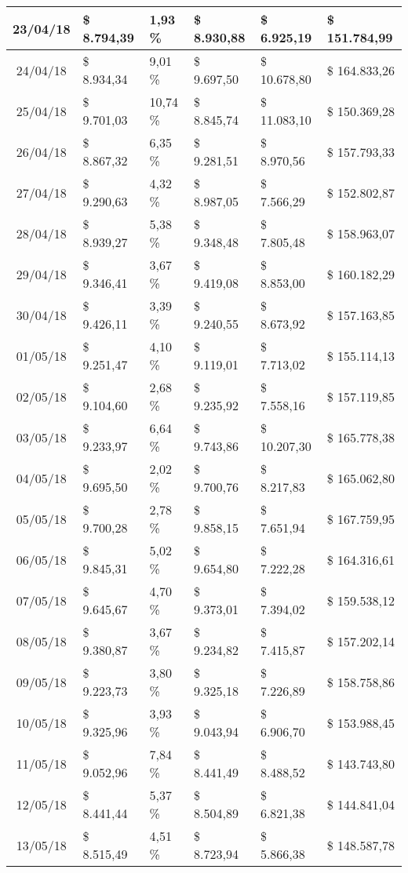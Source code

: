 \begin{small}
\begin{longtable}{|c|l|l|l|l|l|}
23/04/18 & \$ 8.794,39 & 1,93 \% & \$ 8.930,88 & \$ 6.925,19 & \$ 151.784,99 \\ \hline
24/04/18 & \$ 8.934,34 & 9,01 \% & \$ 9.697,50 & \$ 10.678,80 & \$ 164.833,26 \\ \hline
25/04/18 & \$ 9.701,03 & 10,74 \% & \$ 8.845,74 & \$ 11.083,10 & \$ 150.369,28 \\ \hline
26/04/18 & \$ 8.867,32 & 6,35 \% & \$ 9.281,51 & \$ 8.970,56 & \$ 157.793,33 \\ \hline
27/04/18 & \$ 9.290,63 & 4,32 \% & \$ 8.987,05 & \$ 7.566,29 & \$ 152.802,87 \\ \hline
28/04/18 & \$ 8.939,27 & 5,38 \% & \$ 9.348,48 & \$ 7.805,48 & \$ 158.963,07 \\ \hline
29/04/18 & \$ 9.346,41 & 3,67 \% & \$ 9.419,08 & \$ 8.853,00 & \$ 160.182,29 \\ \hline
30/04/18 & \$ 9.426,11 & 3,39 \% & \$ 9.240,55 & \$ 8.673,92 & \$ 157.163,85 \\ \hline
01/05/18 & \$ 9.251,47 & 4,10 \% & \$ 9.119,01 & \$ 7.713,02 & \$ 155.114,13 \\ \hline
02/05/18 & \$ 9.104,60 & 2,68 \% & \$ 9.235,92 & \$ 7.558,16 & \$ 157.119,85 \\ \hline
03/05/18 & \$ 9.233,97 & 6,64 \% & \$ 9.743,86 & \$ 10.207,30 & \$ 165.778,38 \\ \hline
04/05/18 & \$ 9.695,50 & 2,02 \% & \$ 9.700,76 & \$ 8.217,83 & \$ 165.062,80 \\ \hline
05/05/18 & \$ 9.700,28 & 2,78 \% & \$ 9.858,15 & \$ 7.651,94 & \$ 167.759,95 \\ \hline
06/05/18 & \$ 9.845,31 & 5,02 \% & \$ 9.654,80 & \$ 7.222,28 & \$ 164.316,61 \\ \hline
07/05/18 & \$ 9.645,67 & 4,70 \% & \$ 9.373,01 & \$ 7.394,02 & \$ 159.538,12 \\ \hline
08/05/18 & \$ 9.380,87 & 3,67 \% & \$ 9.234,82 & \$ 7.415,87 & \$ 157.202,14 \\ \hline
09/05/18 & \$ 9.223,73 & 3,80 \% & \$ 9.325,18 & \$ 7.226,89 & \$ 158.758,86 \\ \hline
10/05/18 & \$ 9.325,96 & 3,93 \% & \$ 9.043,94 & \$ 6.906,70 & \$ 153.988,45 \\ \hline
11/05/18 & \$ 9.052,96 & 7,84 \% & \$ 8.441,49 & \$ 8.488,52 & \$ 143.743,80 \\ \hline
12/05/18 & \$ 8.441,44 & 5,37 \% & \$ 8.504,89 & \$ 6.821,38 & \$ 144.841,04 \\ \hline
13/05/18 & \$ 8.515,49 & 4,51 \% & \$ 8.723,94 & \$ 5.866,38 & \$ 148.587,78 \\ \hline

\end{longtable}
\end{small}
